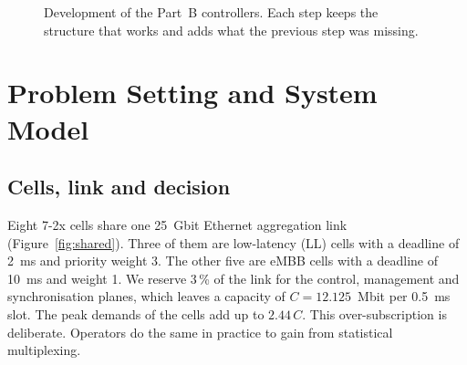 \begin{figure}[H]
\centering
{}
\caption{Development of the Part~B controllers. Each step keeps the structure that works and adds what the previous step was missing.}
\label{fig:b-roadmap}
\end{figure}

\section{Problem Setting and System Model}
\label{sec:b-model}

\subsection{Cells, link and decision}

Eight 7-2x cells share one 25~Gbit Ethernet aggregation link (Figure~\ref{fig:shared}). Three of them are low-latency (LL) cells with a deadline of 2~ms and priority weight 3. The other five are eMBB cells with a deadline of 10~ms and weight 1. We reserve 3\,\% of the link for the control, management and synchronisation planes, which leaves a capacity of $C = 12.125$~Mbit per 0.5~ms slot. The peak demands of the cells add up to $2.44\,C$. This over-subscription is deliberate. Operators do the same in practice to gain from statistical multiplexing.

